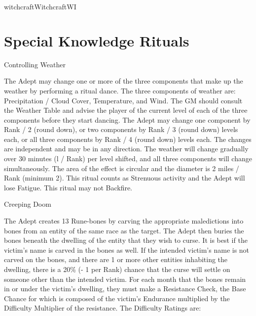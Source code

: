 \begin{College}[1.1]{witchcraft}{Witchcraft}{WI}
\section{Special Knowledge Rituals}

\begin{ritual}[R-1]{Controlling Weather}

\begin{effects}
The Adept may change one or more of the three components that make up
the weather by performing a ritual dance. The three components of
weather are: Precipitation / Cloud Cover, Temperature, and Wind.  The
GM should consult the Weather Table and advise the player of the
current level of each of the three components before they start
dancing.  The Adept may change one component by Rank / 2 (round down),
or two components by Rank / 3 (round down) levels each, or all three
components by Rank / 4 (round down) levels each.  The changes are
independent and may be in any direction.  The weather will change
gradually over 30 minutes (l / Rank) per level shifted, and all three
components will change simultaneously.  The area of the effect is
circular and the diameter is 2 miles / Rank (minimum 2). This ritual
counts as Strenuous activity and the Adept will lose Fatigue. This
ritual may not Backfire.
\end{effects}
\end{ritual}

\begin{ritual}[R-2]{Creeping Doom}

\begin{effects}
The Adept creates 13 Rune-bones by carving the appropriate
maledictions into bones from an entity of the same race as the
target. The Adept then buries the bones beneath the dwelling of the
entity that they wish to curse.  It is best if the victim’s name is
carved in the bones as well.  If the intended victim’s name is not
carved on the bones, and there are 1 or more other entities inhabiting
the dwelling, there is a 20\% (- 1 per Rank) chance that the curse
will settle on someone other than the intended victim.  For each month
that the bones remain in or under the victim’s dwelling, they must
make a Resistance Check, the Base Chance for which is composed of the
victim’s Endurance multiplied by the Difficulty Multiplier of the
resistance. The Difficulty Ratings are:


\end{effects}
\end{ritual}
\end{College}
